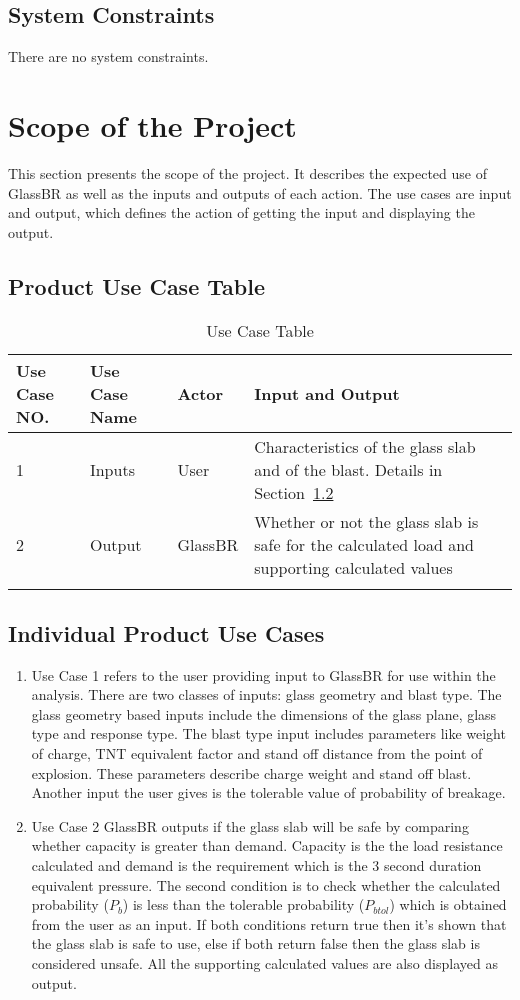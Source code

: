 \documentclass[12pt]{article}
\begin{document}
\subsection{System Constraints}
\label{Sec:SystCons}
There are no system constraints.
\section{Scope of the Project}
\label{Sec:ScopoftheProj}
This section presents the scope of the project. It describes the expected use of GlassBR as well as the inputs and outputs of each action. The use cases are input and output, which defines the action of getting the input and displaying the output.
\subsection{Product Use Case Table}
\label{Sec:ProdUseCaseTabl}
\begin{longtable}{l l l l}
\toprule
Use Case NO. & Use Case Name & Actor & Input and Output
\\
\midrule
1 & Inputs & User & Characteristics of the glass slab and of the blast. Details in Section~\ref{Sec:IndiProdUseCase}
\\
2 & Output & GlassBR & Whether or not the glass slab is safe for the calculated load and supporting calculated values
\\
\bottomrule
\caption{Use Case Table}
\label{Table:UseCaseTabl}
\end{longtable}
\subsection{Individual Product Use Cases}
\label{Sec:IndiProdUseCase}
\begin{enumerate}
\item{Use Case 1 refers to the user providing input to GlassBR for use within the analysis. There are two classes of inputs: glass geometry and blast type. The glass geometry based inputs include the dimensions of the glass plane, glass type and response type. The blast type input includes parameters like weight of charge, TNT equivalent factor and stand off distance from the point of explosion. These parameters describe charge weight and stand off blast. Another input the user gives is the tolerable value of probability of breakage.}
\item{Use Case 2 GlassBR outputs if the glass slab will be safe by comparing whether capacity is greater than demand. Capacity is the the load resistance calculated and demand is the requirement which is the 3 second duration equivalent pressure. The second condition is to check whether the calculated probability ($P_{b}$) is less than the tolerable probability ($P_{btol}$) which is obtained from the user as an input. If both conditions return true then it's shown that the glass slab is safe to use, else if both return false then the glass slab is considered unsafe. All the supporting calculated values are also displayed as output.}
\end{enumerate}
\end{document}

